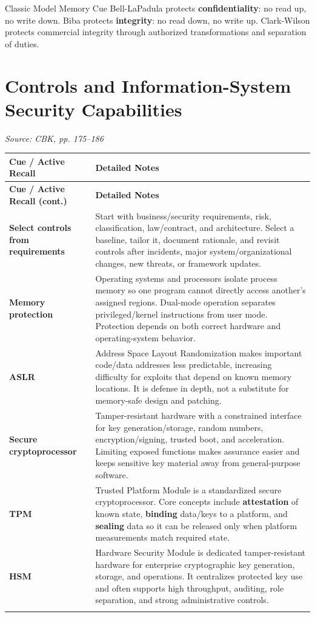 \documentclass[10pt,letterpaper]{article}
\makeatletter
\newenvironment{cornell}{\rowcolors{2}{white}{notebg}\begin{longtable}{@{}>{\raggedright\arraybackslash\columncolor{cuebg}\color{navy}\bfseries}p{0.285\textwidth}>{\raggedright\arraybackslash}p{0.65\textwidth}@{}}
\rowcolor{navy}\color{white}\textbf{Cue / Active Recall} & \color{white}\textbf{Detailed Notes}\\ \hline\endfirsthead
\rowcolor{navy}\color{white}\textbf{Cue / Active Recall (cont.)} & \color{white}\textbf{Detailed Notes}\\ \hline\endhead}{\end{longtable}}
\newcommand{\noterow}[2]{#1 & #2\\\arrayrulecolor{line}\hline}
\newcommand{\source}[1]{\par{\footnotesize\color{teal}\textit{Source: CBK, #1}}\par}
\makeatother
\begin{document}
\begin{exambox}{Classic Model Memory Cue}
Bell-LaPadula protects \textbf{confidentiality}: no read up, no write down. Biba protects \textbf{integrity}: no read down, no write up. Clark-Wilson protects commercial integrity through authorized transformations and separation of duties.
\end{exambox}

\section{\color{navy}Controls and Information-System Security Capabilities}
\source{pp. 175--186}
\begin{cornell}
\noterow{Select controls from requirements}{Start with business/security requirements, risk, classification, law/contract, and architecture. Select a baseline, tailor it, document rationale, and revisit controls after incidents, major system/organizational changes, new threats, or framework updates.}
\noterow{Memory protection}{Operating systems and processors isolate process memory so one program cannot directly access another's assigned regions. Dual-mode operation separates privileged/kernel instructions from user mode. Protection depends on both correct hardware and operating-system behavior.}
\noterow{ASLR}{Address Space Layout Randomization makes important code/data addresses less predictable, increasing difficulty for exploits that depend on known memory locations. It is defense in depth, not a substitute for memory-safe design and patching.}
\noterow{Secure cryptoprocessor}{Tamper-resistant hardware with a constrained interface for key generation/storage, random numbers, encryption/signing, trusted boot, and acceleration. Limiting exposed functions makes assurance easier and keeps sensitive key material away from general-purpose software.}
\noterow{TPM}{Trusted Platform Module is a standardized secure cryptoprocessor. Core concepts include \textbf{attestation} of known state, \textbf{binding} data/keys to a platform, and \textbf{sealing} data so it can be released only when platform measurements match required state.}
\noterow{HSM}{Hardware Security Module is dedicated tamper-resistant hardware for enterprise cryptographic key generation, storage, and operations. It centralizes protected key use and often supports high throughput, auditing, role separation, and strong administrative controls.}
\end{cornell}
\end{document}
